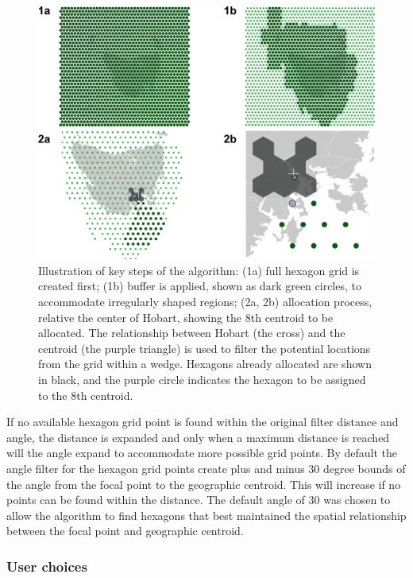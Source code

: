 \begin{Schunk}
\begin{figure}
\includegraphics[width=0.95\linewidth]{kobakian-cook_files/figure-latex/filterprocess-1} \caption[Illustration of key steps of the algorithm]{Illustration of key steps of the algorithm: (1a) full hexagon grid is created first; (1b) buffer is applied, shown as dark green circles, to accommodate irregularly shaped regions; (2a, 2b) allocation process, relative the center of Hobart, showing the 8th centroid to be allocated. The relationship between Hobart (the cross) and the centroid (the purple triangle) is used to filter the potential locations from the grid within a wedge. Hexagons already allocated are shown in black, and the purple circle indicates the hexagon to be assigned to the 8th centroid.}\label{fig:filterprocess}
\end{figure}
\end{Schunk}

If no available hexagon grid point is found within the original filter
distance and angle, the distance is expanded and only when a maximum
distance is reached will the angle expand to accommodate more possible
grid points. By default the angle filter for the hexagon grid points
create plus and minus 30 degree bounds of the angle from the focal point
to the geographic centroid. This will increase if no points can be found
within the  distance. The default angle of 30 was
chosen to allow the algorithm to find hexagons that best maintained the
spatial relationship between the focal point and geographic centroid.

\hypertarget{user-choices}{%
\subsubsection{User choices}\label{user-choices}}

